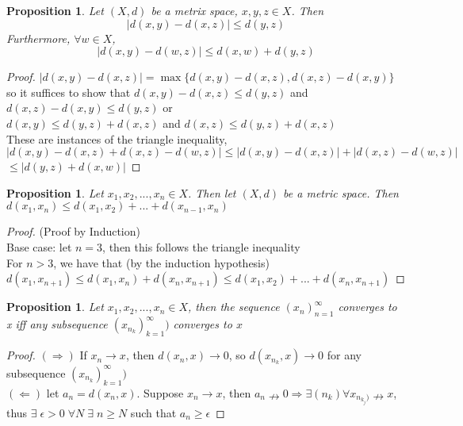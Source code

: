 \documentclass{article}
\newtheorem{proposition}[theorem]{Proposition}
\begin{document}
\begin{proposition}
    Let $(X, d)$ be a metrix space, $x, y, z \in X$. Then
    \begin{equation}
        |d(x,y) - d(x,z)| \leq d(y,z)
    \end{equation}
    Furthermore, $\forall w \in X$,
    \begin{equation}
        |d(x,y) - d(w,z)| \leq d(x,w) + d(y,z)
    \end{equation}
\end{proposition}

\begin{proof}
    $|d(x,y) - d(x,z)| = \max\{d(x,y) - d(x,z), d(x,z) - d(x,y)\}$ so it suffices to show
    that $d(x,y) - d(x,z) \leq d(y,z)$ and $d(x,z) - d(x,y) \leq d(y,z)$ or \\
    $d(x,y) \leq d(y,z) + d(x,z)$ and $d(x,z) \leq d(y,z) + d(x,z)$ \\
    These are instances of the triangle inequality, \\
    $|d(x,y) - d(x,z) + d(x,z) -d(w,z)| \leq |d(x,y) - d(x,z)| + | d(x,z) - d(w,z)|$
    $\leq |d(y,z) + d(x,w)|$
\end{proof}

\begin{proposition}
    Let $x_1, x_2, ... , x_n \in X$. Then let $(X, d)$ be a metric space. Then
    $d(x_1, x_n) \leq d(x_1, x_2) + ... + d(x_{n-1}, x_n)$
\end{proposition}

\begin{proof}
    (Proof by Induction) \\
    Base case: let $n = 3$, then this follows the triangle inequality \checkmark\\
    For $n > 3$, we have that (by the induction hypothesis)\\
    $d(x_1, x_{n+1})\leq d(x_1, x_n)+d(x_n, x_{n+1})\leq d(x_1, x_2)+...+d(x_n, x_{n+1})$
\end{proof}

\begin{proposition}
    Let $x_1, x_2, ... , x_n \in X$, then the sequence $(x_n)_{n=1}^{\infty}$ converges
    to x iff any subsequence $(x_{n_k})_{k=1}^{\infty})$ converges to $x$
\end{proposition}

\begin{proof}
    $(\Rightarrow)$ If $x_n \rightarrow x$, then $d(x_n, x) \rightarrow 0$, so
    $d(x_{n_k}, x) \rightarrow 0$ for any subsequence $(x_{n_k})_{k=1}^{\infty})$ \\
    $(\Leftarrow)$ let $a_n = d(x_n, x)$. Suppose $x_n \rightarrow x$, then
    $a_n \nrightarrow 0 \Rightarrow \exists (n_k) \forall x_{n_{k_j})} \nrightarrow x$,
    thus $\exists\; \epsilon > 0\; \forall N \; \exists\; n \geq N$
    such that $a_n \geq \epsilon$
\end{proof}
\end{document}
